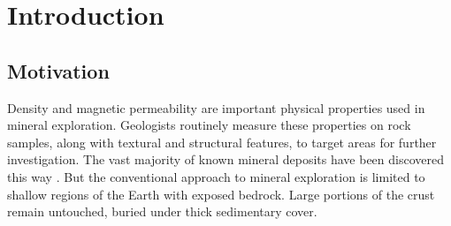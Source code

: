 \graphicspath{{./../../Figures/}}
\chapter{Introduction}
\label{Chapter1}

\section{Motivation}

Density and magnetic permeability are important physical properties used in mineral exploration.  Geologists routinely measure these properties on rock samples, along with textural and structural features, to target areas for further investigation. 
The vast majority of known mineral deposits have been discovered this way \cite[]{Marjoribanks2010}. But the conventional approach to mineral exploration is limited to shallow regions of the Earth with exposed bedrock. Large portions of the crust remain untouched, buried under thick sedimentary cover.

